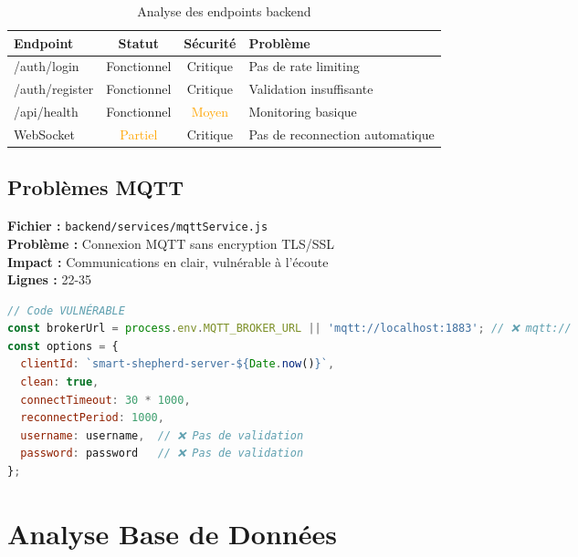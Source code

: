 \documentclass[a4paper,12pt]{article}
\begin{document}
\begin{table}[h]
\centering
\begin{tabular}{|l|c|c|p{4cm}|}
\hline
\textbf{Endpoint} & \textbf{Statut} & \textbf{Sécurité} & \textbf{Problème} \\
\hline
/auth/login & \textcolor{accentgreen}{Fonctionnel} & \textcolor{alertred}{Critique} & Pas de rate limiting \\
\hline
/auth/register & \textcolor{accentgreen}{Fonctionnel} & \textcolor{alertred}{Critique} & Validation insuffisante \\
\hline
/api/health & \textcolor{accentgreen}{Fonctionnel} & \textcolor{orange}{Moyen} & Monitoring basique \\
\hline
WebSocket & \textcolor{orange}{Partiel} & \textcolor{alertred}{Critique} & Pas de reconnection automatique \\
\hline
\end{tabular}
\caption{Analyse des endpoints backend}
\end{table}

\subsection{Problèmes MQTT}

\begin{tcolorbox}[colback=alertred!10, colframe=alertred, title={\faIcon{wifi} Sécurité MQTT}]
\textbf{Fichier :} \texttt{backend/services/mqttService.js} \\
\textbf{Problème :} Connexion MQTT sans encryption TLS/SSL \\
\textbf{Impact :} Communications en clair, vulnérable à l'écoute \\
\textbf{Lignes :} 22-35
\end{tcolorbox}

\begin{lstlisting}[language=JavaScript, caption=Configuration MQTT non sécurisée]
// Code VULNÉRABLE
const brokerUrl = process.env.MQTT_BROKER_URL || 'mqtt://localhost:1883'; // ❌ mqtt://
const options = {
  clientId: `smart-shepherd-server-${Date.now()}`,
  clean: true,
  connectTimeout: 30 * 1000,
  reconnectPeriod: 1000,
  username: username,  // ❌ Pas de validation
  password: password   // ❌ Pas de validation
};
\end{lstlisting}

\section{Analyse Base de Données}
\end{document}
